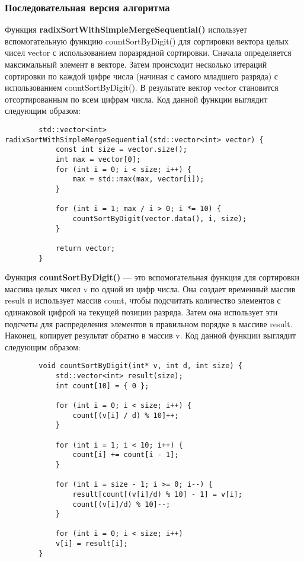 \documentclass[a4paper, 14pt]{article}
\begin{document}
	\subsubsection*{\centering Последовательная версия алгоритма}
	Функция \textbf{radixSortWithSimpleMergeSequential()} использует вспомогательную функцию countSortByDigit() для сортировки вектора целых чисел vector с использованием поразрядной сортировки. Сначала определяется максимальный элемент в векторе. Затем происходит несколько итераций сортировки по каждой цифре числа (начиная с самого младшего разряда) с использованием countSortByDigit(). В результате вектор vector становится отсортированным по всем цифрам числа. Код данной функции выглядит следующим образом:
	\vspace{-1em}
	\begin{verbatim}
		std::vector<int> radixSortWithSimpleMergeSequential(std::vector<int> vector) {
			const int size = vector.size();
			int max = vector[0];
			for (int i = 0; i < size; i++) {
				max = std::max(max, vector[i]);
			}
			
			for (int i = 1; max / i > 0; i *= 10) {
				countSortByDigit(vector.data(), i, size);
			}
			
			return vector;
		}
	\end{verbatim}	

	Функция \textbf{countSortByDigit()} --- это вспомогательная функция для сортировки массива целых чисел v по одной из цифр числа. Она создает временный массив result и использует массив count, чтобы подсчитать количество элементов с одинаковой цифрой на текущей позиции разряда. Затем она использует эти подсчеты для распределения элементов в правильном порядке в массиве result. Наконец, копирует результат обратно в массив v. Код данной функции выглядит следующим образом:
	\vspace{-1em}
	\begin{verbatim}
		void countSortByDigit(int* v, int d, int size) {
			std::vector<int> result(size);
			int count[10] = { 0 };
			
			for (int i = 0; i < size; i++) {
				count[(v[i] / d) % 10]++;
			}
			
			for (int i = 1; i < 10; i++) {
				count[i] += count[i - 1];
			}
			
			for (int i = size - 1; i >= 0; i--) {
				result[count[(v[i]/d) % 10] - 1] = v[i];
				count[(v[i]/d) % 10]--;
			}
			
			for (int i = 0; i < size; i++)
			v[i] = result[i];
		}
	\end{verbatim}
\end{document}
